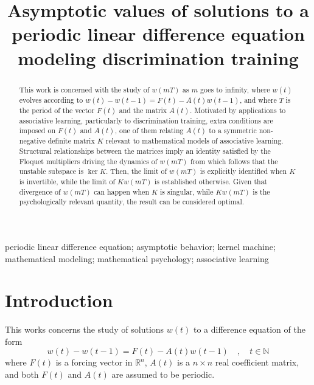 \documentclass[]{interact}
\theoremstyle{plain}%
\theoremstyle{definition}
\theoremstyle{remark}
\begin{document}

\title{Asymptotic values of solutions to a periodic linear difference equation modeling discrimination training}

\author{
}

\maketitle

\begin{abstract}
This work is concerned with the study of $w(mT)$ as $m$ goes to infinity, where $w(t)$ evolves according to $w(t)-w(t-1)=F(t)-A(t)w(t-1)$, and where $T$ is the period of the vector $F(t)$ and the matrix $A(t)$.
Motivated by applications to associative learning, particularly to discrimination training, extra conditions are imposed on $F(t)$ and $A(t)$, one of them relating $A(t)$ to a symmetric non-negative definite matrix $K$ relevant to mathematical models of associative learning.
Structural relationships between the matrices imply an identity satisfied by the Floquet multipliers driving the dynamics of $w(mT)$ from which follows that the unstable subspace is $\ker K$.
Then, the limit of $w(mT)$ is explicitly identified when $K$ is invertible, while the limit of $Kw(mT)$ is established otherwise. Given that divergence of $w(mT)$ can happen when $K$ is singular, while $Kw(mT)$ is the psychologically relevant quantity, the result can be considered optimal.
\end{abstract}

\begin{keywords}
periodic linear difference equation; asymptotic behavior; kernel machine; mathematical modeling; mathematical psychology; associative learning
\end{keywords}

\section{Introduction}

This works concerns the study of solutions $w(t)$ to a difference equation of the form
\begin{equation}\label{eq}
w(t)-w(t-1)=F(t)-A(t)w(t-1) \quad , \quad t\in \mathbb{N}
\end{equation}
where $F(t)$ is a forcing vector in $\mathbb{R}^{n}$, $A(t)$ is a $n\times n$ real coefficient matrix, and both $F(t)$ and $A(t)$ are assumed to be periodic.
\end{document}
